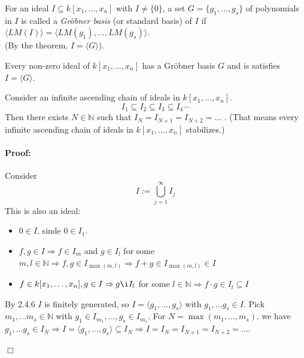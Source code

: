
\begin{definition}[title = Definition 2.4.5]
    For an ideal $I \subseteq k[x_1, \dots, x_n]$ with $I \neq \{0\}$, a set $G = \{g_1, \ldots, g_s\}$ of polynomials in $I$ is called a \textit{Gröbner basis} (or standard basis) of $I$ if $\langle LM(I) \rangle = \langle LM(g_1), \ldots, LM(g_s) \rangle$. \\
    (By the theorem, $I = \langle G \rangle $). 
\end{definition}

\begin{corollary}[title = Corollary 2.4.6]
    Every non-zero ideal of $k[x_1, \dots, x_n]$ has a Gröbner basis $G$ and is satisfies $I = \langle G  \rangle $.
\end{corollary} 

\begin{theorem}[title = Theorem 2.4.7 (ACC (The Ascending Chain Condition))]
  Consider an  infinite ascending chain of ideals in $k[x_1, \dots, x_n]$. 
  \[I_1 \subseteq I_2 \subseteq I_3 \subseteq I_4 \cdots\] 
  Then there exists $N \in \mathbb{N}$ such that $I_N = I_{N+1} = I_{N+2} = \ldots$ . 
  (That means every infinite ascending chain of ideals in $k[x_1, \dots, x_n]$ stabilizes.) 

  \paragraph{Proof:}  Consider
  \[ I := \bigcup_{j=1}^{\infty} I_j \]
  This is also an ideal: 

  \begin{itemize}
    \item $0 \in I$, sinde $0 \in I_1$.  
    \item $f, g \in I \Rightarrow f \in I_m$ and $g \in I_l$ for some $m, l \in \mathbb{N} \Rightarrow f, g \in I_{\max(m,l)} \Rightarrow f + g \in I_{\max(m,l)} \in I$ 
    \item $f \in k[x_1, \dots, x_n], g \in I \Rightarrow g \i I_l$ for some $l \in \mathbb{N} \Rightarrow f \cdot g \in I_l \subseteq I$    
  \end{itemize}

  By 2.4.6 $I$ is finitely generated, so $I = \langle g_1, \ldots, g_s \rangle$ with $g_1, \ldots g_s \in I$. Pick $m_1, \ldots m_s \in \mathbb{N}$ with $g_1 \in I_{m_1}, \ldots, g_s \in I_{m_s}$. 
  For $N = \max(m_1, \ldots, m_s)$.  we have $g_1, \ldots g_s \in I_N \Rightarrow I = \langle g_1, \ldots, g_s \rangle \subseteq I_N \Rightarrow I = I_N = I_{N+1} = I_{N+2} = \ldots$. 

    \begin{flushright}
      $\Box $
    \end{flushright}
\end{theorem} \ \\

